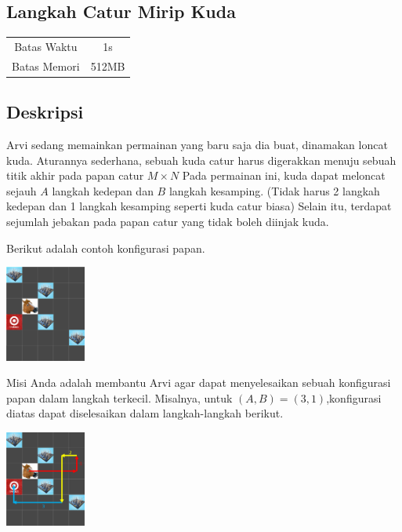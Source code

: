 \documentclass{article}
\begin{document}
\begin{center}
    \section*{Langkah Catur Mirip Kuda} %

    \begin{tabular}{ | c c | }
        \hline
        Batas Waktu  & 1s \\    %
        Batas Memori & 512MB \\  %
        \hline
    \end{tabular}
\end{center}

\subsection*{Deskripsi}

Arvi sedang memainkan permainan yang baru saja dia buat, dinamakan loncat kuda. 
Aturannya sederhana, sebuah kuda catur harus digerakkan menuju sebuah titik akhir pada papan catur $M \times N$
Pada permainan ini, kuda dapat meloncat sejauh $A$ langkah kedepan dan $B$ langkah kesamping. 
(Tidak harus 2 langkah kedepan dan 1 langkah kesamping seperti kuda catur biasa)
Selain itu, terdapat sejumlah jebakan pada papan catur yang tidak boleh diinjak kuda.

Berikut adalah contoh konfigurasi papan.

\includegraphics[width=100px]{Initial-Configuration}

Misi Anda adalah membantu Arvi agar dapat menyelesaikan sebuah konfigurasi papan dalam langkah terkecil.
Misalnya, untuk $(A,B)=(3,1)$,konfigurasi diatas dapat diselesaikan dalam langkah-langkah berikut.

\includegraphics[width=100px]{Movelist}
\end{document}
